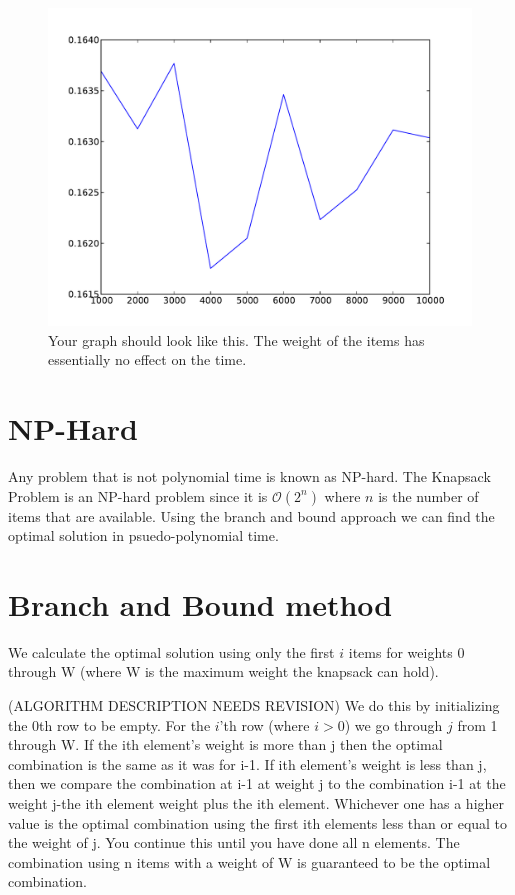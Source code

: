 \begin{figure}[H]
\includegraphics[scale = .5]{naiveWeight.pdf}
\caption{
Your graph should look like this.
The weight of the items has essentially no effect on the time.}
\end{figure}

\section*{NP-Hard}

Any problem that is not polynomial time is known as NP-hard.
The Knapsack Problem is an NP-hard problem since it is $\mathcal{O}\left(2^n\right)$ where $n$ is the number of items that are available.
Using the branch and bound approach we can find the optimal solution in psuedo-polynomial time.

\section*{Branch and Bound method}

We calculate the optimal solution using only the first $i$ items for weights 0 through W (where W is the maximum weight the knapsack can hold).

(ALGORITHM DESCRIPTION NEEDS REVISION)
We do this by initializing the 0th row to be empty.
For the $i$'th row (where $i>0$) we go through $j$ from 1 through W.
If the ith element's weight is more than j then the optimal combination is the same as it was for i-1.
If ith element's weight is less than j, then we compare the combination at i-1 at weight j to the combination i-1 at the weight j-the ith element weight plus the ith element.
Whichever one has a higher value is the optimal combination using the first ith elements less than or equal to the weight of j.
You continue this until you have done all n elements.
The combination using n items with a weight of W is guaranteed to be the optimal combination.

